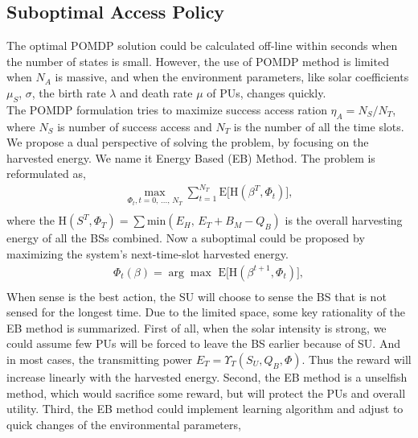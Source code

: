 \documentclass[conference]{IEEEtran}
\begin{document}
\subsection{Suboptimal Access Policy}
The optimal POMDP solution could be calculated off-line within seconds when the number of states is small.
However, the use of POMDP method is limited when \(N_A\) is massive,
and when the environment parameters, like solar coefficients \(\mu_S\), \(\sigma\),
the birth rate \(\lambda\) and death rate \(\mu\) of PUs, changes quickly.\\
The POMDP formulation tries to maximize success access ration \(\eta_A = N_S/N_T\),
where \(N_S\) is number of success access and \(N_T\) is the number of all the time slots.
We propose a dual perspective of solving the problem, by focusing on the harvested energy.
We name it Energy Based (EB) Method.
The problem is reformulated as,
\begin{equation}
\begin{aligned}
	\underset{\Phi_t,t=0,\,...,\,N_T}{\max}\sum\nolimits_{t=1}^{N_T}\mbox{E}\lbrack\mbox{H}\left(\beta^T, \Phi_t\right)\rbrack,\\
\end{aligned}
\end{equation}
where the \(\mbox{H}\left(S^T, \Phi_T\right) = \sum\mbox{min}\left(E_H,\,E_T+B_M-Q_B\right)\)
is the overall harvesting energy of all the BSs combined.
Now a suboptimal could be proposed by maximizing the system's next-time-slot harvested energy.
\begin{equation}
\begin{aligned}
	\Phi_t\left(\beta\right) = \arg{\max}\,\,\mbox{E}\lbrack\mbox{H}(\beta^{t+1}, \Phi_t)\rbrack,\\
\end{aligned}
\end{equation}
When sense is the best action, the SU will choose to sense the BS that is not sensed for the longest time.
Due to the limited space, some key rationality of the EB method is summarized.
First of all, when the solar intensity is strong,
we could assume few PUs will be forced to leave the BS earlier because of SU. 
And in most cases, the transmitting power \(E_T = \Upsilon_T(S_U, Q_B, \Phi)\).
Thus the reward will increase linearly with the harvested energy.
Second, the EB method is a unselfish method, which would sacrifice some reward,
but will protect the PUs and overall utility.
Third, the EB method could implement learning algorithm and adjust to quick changes of the environmental parameters,
\end{document}
